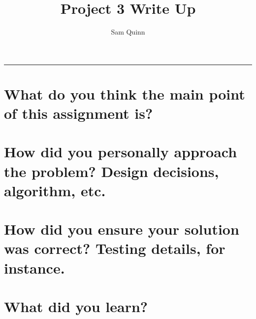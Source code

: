 \documentclass[letterpaper,10pt,notitlepage,fleqn]{article}
\title{Project 3 Write Up}
\author{Sam Quinn}
\begin{document}
\maketitle
\hrule

\section*{What do you think the main point of this assignment is?}

\section*{How did you personally approach the problem? Design decisions, algorithm, etc.}

\section*{How did you ensure your solution was correct? Testing details, for instance.}

\section*{What did you learn?}
\end{document}
